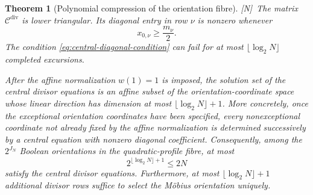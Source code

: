 \documentclass[11pt]{amsart}
\numberwithin{equation}{section}
\theoremstyle{plain}
\newtheorem{theorem}{Theorem}[section]
\theoremstyle{definition}
\theoremstyle{remark}
\newcommand{\tagN}{\textup{[N]}}
\begin{document}
\begin{theorem}[Polynomial compression of the orientation fibre]
\label{thm:polynomial-orientation-compression}
\tagN\ The matrix $\mathscr C^{\mathrm{div}}$ is lower triangular.  Its
diagonal entry in row $\nu$ is nonzero whenever
\begin{equation}
x_{0,\nu}\ge \frac{m_\nu}{2}.
\label{eq:central-diagonal-condition}
\end{equation}
The condition \eqref{eq:central-diagonal-condition} can fail for at most
$\lfloor\log_2N\rfloor$ completed excursions.

After the affine normalization $w(1)=1$ is imposed, the solution set of the
central divisor equations is an affine subset of the orientation-coordinate
space whose linear direction has dimension at most
$\lfloor\log_2N\rfloor+1$.  More concretely, once the exceptional orientation
coordinates have been specified, every nonexceptional coordinate not already
fixed by the affine normalization is determined successively by a central
equation with nonzero diagonal coefficient.  Consequently, among the
$2^{J_N}$ Boolean orientations in the quadratic-profile fibre, at most
\begin{equation}
2^{\lfloor\log_2N\rfloor+1}\le2N
\label{eq:polynomial-survivors}
\end{equation}
satisfy the central divisor equations.  Furthermore, at most
$\lfloor\log_2N\rfloor+1$ additional divisor rows suffice to select the
M\"obius orientation uniquely.
\end{theorem}
\end{document}
